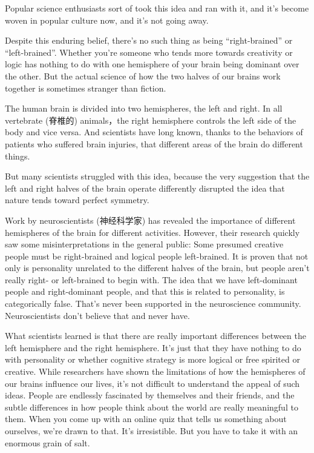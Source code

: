 \documentclass[UTF8,11pt]{ctexart}
\begin{document}
Popular science enthusiasts sort of took this idea and ran with it, and it’s become woven in popular culture now, and it’s not going away.


Despite this enduring belief, there’s no such thing as being “right-brained” or “left-brained”. Whether you’re someone who tends more towards creativity or logic has nothing to do with one hemisphere of your brain being dominant over the other. But the actual science of how the two halves of our brains work together is sometimes stranger than fiction.


The human brain is divided into two hemispheres, the left and right. In all vertebrate (脊椎的) animals，the right hemisphere controls the left side of the body and vice versa. And scientists have long known, thanks to the behaviors of patients who suffered brain injuries, that different areas of the brain do different things.


But many scientists struggled with this idea, because the very suggestion that the left and right halves of the brain operate differently disrupted the idea that nature tends toward perfect symmetry.


Work by neuroscientists (神经科学家) has revealed the importance of different hemispheres of the brain for different activities. However, their research quickly saw some misinterpretations in the general public: Some presumed creative people must be right-brained and logical people left-brained. It is proven that not only is personality unrelated to the different halves of the brain, but people aren’t really right- or left-brained to begin with. The idea that we have left-dominant people and right-dominant people, and that this is related to personality, is categorically false. That’s never been supported in the neuroscience community. Neuroscientists don’t believe that and never have.


What scientists learned is that there are really important differences between the left hemisphere and the right hemisphere. It’s just that they have nothing to do with personality or whether cognitive strategy is more logical or free spirited or creative. While researchers have shown the limitations of how the hemispheres of our brains influence our lives, it’s not difficult to understand the appeal of such ideas. People are endlessly fascinated by themselves and their friends, and the subtle differences in how people think about the world are really meaningful to them. When you come up with an online quiz that tells us something about ourselves, we’re drawn to that. It’s irresistible. But you have to take it with an enormous grain of salt.
\end{document}
